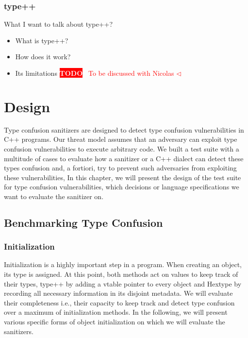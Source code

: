 \documentclass[a4paper,11pt,oneside]{report}
\newcommand{\todobox}[3]{%
       \colorbox{#1}{\textcolor{white}{\sffamily\bfseries\scriptsize #2}}%
       ~\textcolor{#1}{#3} %
       \textcolor{#1}{$\triangleleft$}%
}
\newcommand{\adrbqt}[1]{\todobox{red}{TODO}{#1}}
\begin{document}
\subsection{type++}

What I want to talk about type++?
\begin{itemize}
       \item What is type++?
       \item How does it work?
       \item Its limitations \adrbqt{To be discussed with Nicolas}
\end{itemize}


\chapter{Design}

Type confusion sanitizers are designed to detect type confusion vulnerabilities
in C++ programs.  Our threat model assumes that an adversary can exploit type
confusion vulnerabilities to execute arbitrary code.  We built a test suite with
a multitude of cases to evaluate how a sanitizer or a C++ dialect can detect
these types confusion and, a fortiori, try to prevent such adversaries from
exploiting these vulnerabilities, In this chapter, we will present the design of
the test suite for type confusion vulnerabilities, which decisions or language
specifications we want to evaluate the sanitizer on.

\section{Benchmarking Type Confusion}

\subsection{Initialization}

\noindent{}Initialization is a highly important step in a program. When creating 
an object, its type is assigned. At this point, both methods act on
values to keep track of their types, type++ by adding a vtable pointer to every
object and Hextype by recording all necessary information in its disjoint
metadata. We will evaluate their completeness i.e., their capacity to keep track 
and detect type confusion over a maximum of initialization methods. 
In the following, we will present various specific forms of object initialization 
on which we will evaluate the sanitizers.
\end{document}
